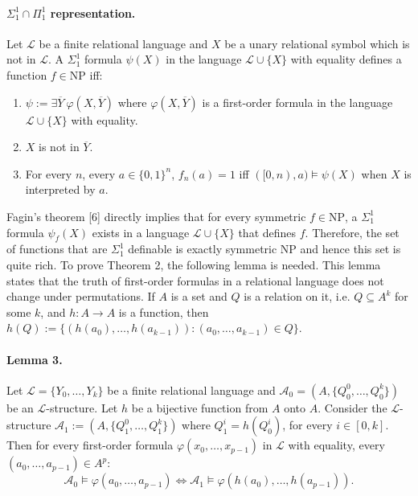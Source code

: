\documentclass[10pt,a4paper]{article}
\begin{document}
\paragraph{$\Sigma_1^1\cap\Pi_1^1$ representation.} Let $\mathcal L$ be a finite relational language and $X$ be a unary relational symbol which is not in $\mathcal L$. A $\Sigma_1^1$ formula $\psi(X)$ in the language $\mathcal L\cup\{X\}$ with equality defines a function $f\in\mathrm{NP}$ iff:
\begin{enumerate}
\item $\psi:=\exists\overline Y\ \varphi(X,\overline Y)$ where $\varphi(X,\overline Y)$ is a first-order formula in the language $\mathcal L\cup\{X\}$ with equality.
\item $X$ is not in $\overline Y$.
\item For every $n$, every $a\in\{0,1\}^n$, $f_n(a)=1$ iff $([0,n),a)\models\psi(X)$ when $X$ is interpreted by $a$.
\end{enumerate}
Fagin's theorem [6] directly implies that for every symmetric $f\in\mathrm{NP}$, a $\Sigma_1^1$ formula $\psi_f(X)$ exists in a language $\mathcal L\cup\{X\}$ that defines $f$. Therefore, the set of functions that are $\Sigma_1^1$ definable is exactly symmetric NP and hence this set is quite rich.
To prove Theorem 2, the following lemma is needed. This lemma states that the truth of first-order formulas in a relational language does not change under permutations.
If $A$ is a set and $Q$ is a relation on it, i.e. $Q\subseteq A^k$ for some $k$, and $h:A\to A$ is a function, then $h(Q):=\{(h(a_0),\ldots,h(a_{k-1})):(a_0,\ldots,a_{k-1})\in Q\}$.
\paragraph{Lemma 3.} Let $\mathcal L=\{Y_0,\ldots,Y_k\}$ be a finite relational language and $\mathcal A_0=(A,\{Q_0^0,\ldots,Q_0^k\})$ be an $\mathcal L$-structure. Let $h$ be a bijective function from $A$ onto $A$. Consider the $\mathcal L$-structure $\mathcal A_1:=(A,\{Q_1^0,\ldots,Q_1^k\})$ where $Q_1^i=h(Q_0^i)$, for every $i\in[0,k]$. Then for every first-order formula $\varphi(x_0,\ldots,x_{p-1})$ in $\mathcal L$ with equality, every $(a_0,\ldots,a_{p-1})\in A^p$:
\[\mathcal A_0\models\varphi(a_0,\ldots,a_{p-1})\Longleftrightarrow\mathcal A_1\models\varphi(h(a_0),\ldots,h(a_{p-1})).\]
\end{document}
